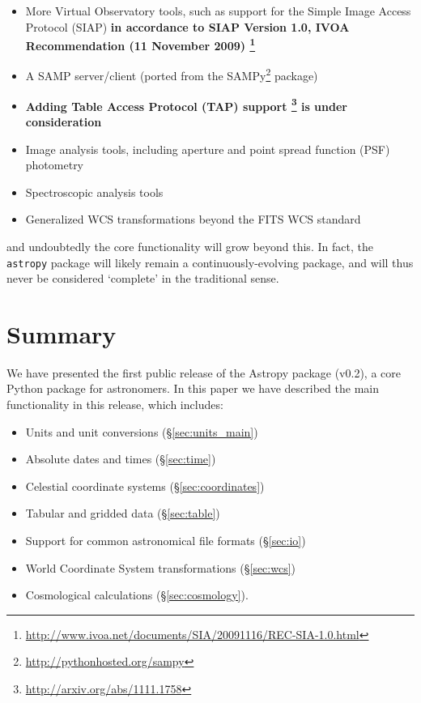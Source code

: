 \documentclass[traditabstract]{aa}
\newcommand{\astropy}{\texttt{astropy}\xspace}
\begin{document}
\begin{itemize}
\item More Virtual Observatory tools, such as support for the Simple Image Access Protocol (SIAP) \textbf{in accordance to SIAP Version 1.0, IVOA Recommendation (11 November 2009) \footnote{\url{http://www.ivoa.net/documents/SIA/20091116/REC-SIA-1.0.html}}}
\item A SAMP server/client (ported from the SAMPy\footnote{\url{http://pythonhosted.org/sampy}} package)
\item \textbf{Adding Table Access Protocol (TAP) support \footnote{\url{http://arxiv.org/abs/1111.1758}} is under consideration}
\item Image analysis tools, including aperture and point spread function (PSF) photometry
\item Spectroscopic analysis tools
\item Generalized WCS transformations beyond the FITS WCS standard
\end{itemize}

\noindent and undoubtedly the core functionality will grow beyond this. In
fact, the \astropy package will likely remain a continuously-evolving package,
and will thus never be considered `complete' in the traditional sense.

\section{Summary}

\label{sec:summary}


We have presented the first public release of the Astropy package (v0.2), a
core Python package for astronomers. In this paper we have described the main
functionality in this release, which includes:

\begin{itemize}
\item Units and unit conversions (\S\ref{sec:units_main})
\item Absolute dates and times (\S\ref{sec:time})
\item Celestial coordinate systems (\S\ref{sec:coordinates})
\item Tabular and gridded data (\S\ref{sec:table})
\item Support for common astronomical file formats (\S\ref{sec:io})
\item World Coordinate System transformations (\S\ref{sec:wcs})
\item Cosmological calculations (\S\ref{sec:cosmology}).
\end{itemize}
\end{document}
